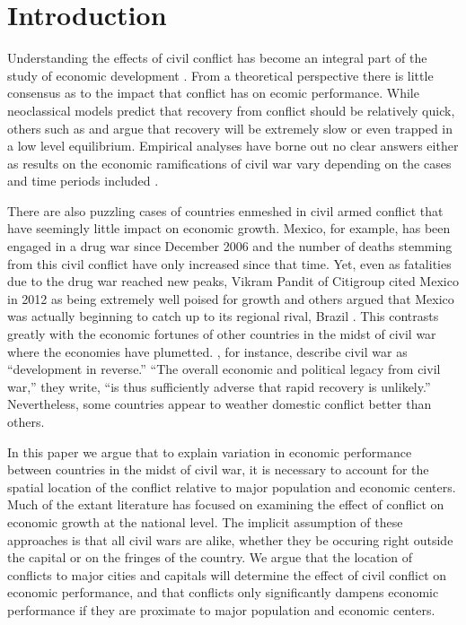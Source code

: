 \section{Introduction}
\label{intro}

Understanding the effects of civil conflict has become an integral part of the study of economic development \citep{serneels:verpoorten:2013}. From a theoretical perspective there is little consensus as to the impact that conflict has on ecomic performance. While neoclassical models predict that recovery from conflict should be relatively quick, others such as \citet{barro:martin:2004} and \citet{sachs:2006} argue that recovery will be extremely slow or even trapped in a low level equilibrium. Empirical analyses have borne out no clear answers either as results on the economic ramifications of civil war vary depending on the cases and time periods included \citep{kang:meernik:2005}. 

There are also puzzling cases of countries enmeshed in civil armed conflict that have seemingly little impact on economic growth. Mexico, for example, has been engaged in a drug war since December 2006 and the number of deaths stemming from this civil conflict have only increased since that time. Yet, even as fatalities due to the drug war reached new peaks, Vikram Pandit of Citigroup cited Mexico in 2012 as being extremely well poised for growth and others argued that Mexico was actually beginning to catch up to its regional rival, Brazil \citep{vardi:2012}. This contrasts greatly with the economic fortunes of other countries in the midst of civil war where the economies have plumetted. \cite{collier:elliott:etal:2003}, for instance, describe civil war as ``development in reverse.''  ``The overall economic and political legacy from civil war,'' they write, ``is thus sufficiently adverse that rapid recovery is unlikely.''  Nevertheless, some countries appear to weather domestic conflict better than others.  


In this paper we argue that to explain variation in economic performance between countries in the midst of civil war, it is necessary to account for the spatial location of the conflict relative to major population and economic centers. Much of the extant literature has focused on examining the effect of conflict on economic growth at the national level. The implicit assumption of these approaches is that all civil wars are alike, whether they be occuring right outside the capital or on the fringes of the country. We argue that the location of conflicts to major cities and capitals will determine the effect of civil conflict on economic performance, and that conflicts only significantly dampens economic performance if they are proximate to major population and economic centers. 

